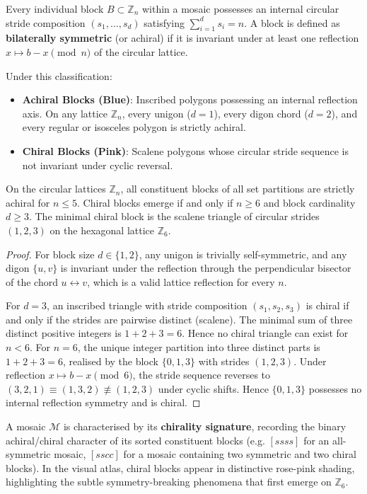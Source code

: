 Every individual block $B \subset \mathbb{Z}_n$ within a mosaic possesses an internal circular stride composition $(s_1, \dots, s_d)$ satisfying $\sum_{i=1}^d s_i = n$. A block is defined as \textbf{bilaterally symmetric} (or achiral) if it is invariant under at least one reflection $x \mapsto b - x \pmod n$ of the circular lattice. 

Under this classification:
\begin{itemize}
    \item \textbf{Achiral Blocks (Blue)}: Inscribed polygons possessing an internal reflection axis. On any lattice $\mathbb{Z}_n$, every unigon ($d=1$), every digon chord ($d=2$), and every regular or isosceles polygon is strictly achiral.
    \item \textbf{Chiral Blocks (Pink)}: Scalene polygons whose circular stride sequence is not invariant under cyclic reversal.
\end{itemize}

\begin{theorem}
On the circular lattices $\mathbb{Z}_n$, all constituent blocks of all set partitions are strictly achiral for $n \le 5$. Chiral blocks emerge if and only if $n \ge 6$ and block cardinality $d \ge 3$. The minimal chiral block is the scalene triangle of circular strides $(1, 2, 3)$ on the hexagonal lattice $\mathbb{Z}_6$.
\end{theorem}

\begin{proof}
For block size $d \in \{1, 2\}$, any unigon is trivially self-symmetric, and any digon $\{u, v\}$ is invariant under the reflection through the perpendicular bisector of the chord $u \leftrightarrow v$, which is a valid lattice reflection for every $n$. 

For $d = 3$, an inscribed triangle with stride composition $(s_1, s_2, s_3)$ is chiral if and only if the strides are pairwise distinct (scalene). The minimal sum of three distinct positive integers is $1 + 2 + 3 = 6$. Hence no chiral triangle can exist for $n < 6$. For $n = 6$, the unique integer partition into three distinct parts is $1 + 2 + 3 = 6$, realised by the block $\{0, 1, 3\}$ with strides $(1, 2, 3)$. Under reflection $x \mapsto b - x \pmod 6$, the stride sequence reverses to $(3, 2, 1) \equiv (1, 3, 2) \not\equiv (1, 2, 3)$ under cyclic shifts. Hence $\{0, 1, 3\}$ possesses no internal reflection symmetry and is chiral.
\end{proof}

A mosaic $\mathcal{M}$ is characterised by its \textbf{chirality signature}, recording the binary achiral/chiral character of its sorted constituent blocks (e.g. $[ssss]$ for an all-symmetric mosaic, $[sscc]$ for a mosaic containing two symmetric and two chiral blocks). In the visual atlas, chiral blocks appear in distinctive rose-pink shading, highlighting the subtle symmetry-breaking phenomena that first emerge on $\mathbb{Z}_6$.

